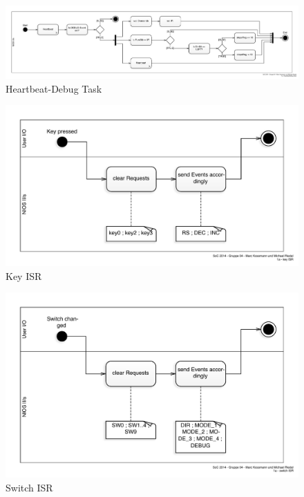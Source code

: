 \documentclass[ngerman,fontsize=12pt , paper=a4 , twoside=false , DIV12 , BCOR=1cm ,
numbers=enddot , listof=totoc , bibliography=totoc , index=totoc ,
headings=small , headlines=1.5 , final]{scrbook}
\begin{document}
\begin{figure}[htbp]
\centering
\includegraphics{../Diagrams/Activities/Tasks/Heartbeat-Debug.pdf}
\caption{Heartbeat-Debug Task\label{fig:heartbeat_debug}}
\end{figure}

\newpage

\begin{figure}[htbp]
\centering
\includegraphics{../Diagrams/Activities/ISR/key_ISR.pdf}
\caption{Key ISR\label{fig:key_isr}}
\end{figure}

\begin{figure}[htbp]
\centering
\includegraphics{../Diagrams/Activities/ISR/switch_ISR.pdf}
\caption{Switch ISR\label{fig:switch_isr}}
\end{figure}
\end{document}

